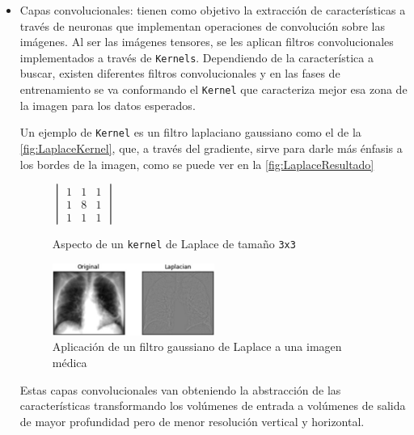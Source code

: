 \begin{itemize}
    \item Capas convolucionales: tienen como objetivo la extracción de características a través de neuronas que implementan operaciones de convolución sobre las imágenes. 
    Al ser las imágenes tensores, se les aplican filtros convolucionales implementados a través de \texttt{Kernels}. 
    Dependiendo de la característica a buscar, existen diferentes filtros convolucionales y en las fases de entrenamiento se va conformando el \texttt{Kernel} que caracteriza mejor esa zona de la imagen para los datos esperados.

    Un ejemplo de \texttt{Kernel} es un filtro laplaciano gaussiano como el de la \autoref{fig:LaplaceKernel}, que, a través del gradiente, sirve para darle más énfasis a los bordes de la imagen, como se puede ver 
    en la \autoref{fig:LaplaceResultado}
    \begin{figure}[H]
        \centering
        \(
        \begin{vmatrix}
            1 & 1 & 1 \\
            1 & 8 & 1 \\
            1 & 1 & 1
        \end{vmatrix}
        \)
        \caption{Aspecto de un \texttt{kernel} de Laplace de tamaño \texttt{3x3}}
        \label{fig:LaplaceKernel}
    \end{figure}
    \begin{figure}[H]
        \centering
        \includegraphics[width=0.5\textwidth]{images/4/KernelsTipicos.jpg}
        \caption{Aplicación de un filtro gaussiano de Laplace a una imagen médica\cite{LaplacianFilterOverview}}
        \label{fig:LaplaceResultado}
    \end{figure}

    Estas capas convolucionales van obteniendo la abstracción de las características transformando los volúmenes de entrada a volúmenes de salida de mayor profundidad pero de menor resolución vertical y horizontal.


\end{itemize}
